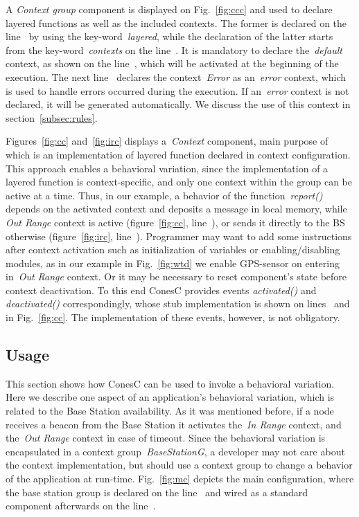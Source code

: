 A \emph{Context group} component is displayed on Fig.~\ref{fig:ccc} and used to declare layered
functions as well as the included contexts. The former is declared on the line~
by using the key-word~\emph{layered}, while the declaration of the latter starts from the
key-word~\emph{contexts} on the line~. It is mandatory to declare
the~\emph{default} context, as shown on the line~, which will be
activated at the beginning of the execution. The next line~ declares the
context~\emph{Error} as an~\emph{error} context, which is used to handle errors occurred
during the execution. If an~\emph{error} context is not declared, it will be generated automatically.
We discuss the use of this context in section~\ref{subsec:rules}.



Figures~\ref{fig:cc} and~\ref{fig:irc} displays a~\emph{Context} component, main
purpose of which is an implementation of layered function declared in context configuration. 
This approach enables a behavioral variation, since the implementation of a layered function is
context-specific, and only one context within the group can be active at a time. Thus, in our
example, a behavior of the function~\emph{report()} depends on the activated context and
deposits a message in local memory, while \emph{Out Range} context
is active (figure~\ref{fig:cc}, line~),
or sends it directly to the BS otherwise (figure~\ref{fig:irc}, line~).
Programmer may want to add some instructions after
context activation such as initialization of variables or enabling/disabling
modules, as in our example in Fig.~\ref{fig:wtd} we enable GPS-sensor on entering
in~\emph{Out Range} context. Or it may be necessary to reset component's state before context
deactivation. To this end ConesC provides events \emph{activated()} and
\emph{deactivated()} correspondingly, whose stub implementation is shown on
lines~ and~ in Fig.~\ref{fig:cc}. The implementation of
these events, however, is not obligatory.



\subsection{Usage}

This section shows how ConesC can be used to invoke a behavioral
variation. Here we describe one aspect of an application's behavioral variation,
which is related to the Base Station availability. As it was mentioned before,
if a node receives a beacon from the Base Station it activates the~\emph{In Range}
context, and the~\emph{Out Range} context in case of timeout.
Since the behavioral variation is encapsulated in a context group~\emph{BaseStationG},
a developer may not care about the context implementation, but should use a context group
to change a behavior of the application at run-time. Fig.~\ref{fig:mc} depicts the main
configuration, where the base station group is declared on the line~ and wired
as a standard component afterwards on the line~.

